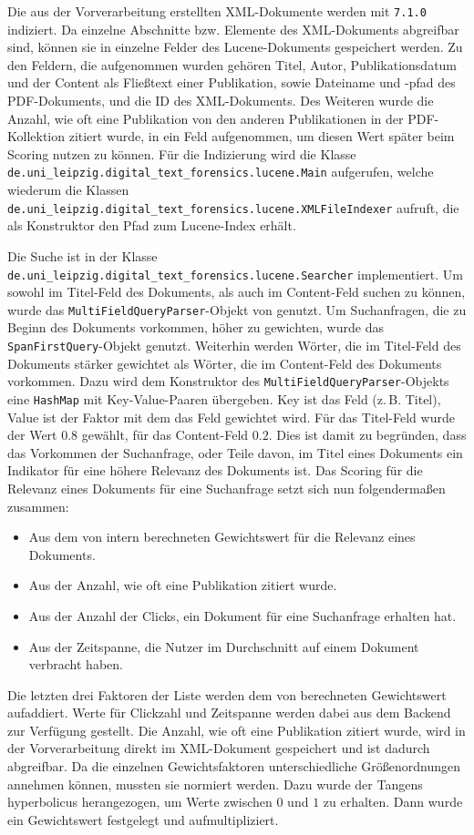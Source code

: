Die aus der Vorverarbeitung erstellten XML-Dokumente werden mit
\lucene \lstinline{7.1.0} indiziert.  Da einzelne Abschnitte
bzw. Elemente des XML-Dokuments abgreifbar sind, können sie in
einzelne Felder des Lucene-Dokuments gespeichert werden.  Zu den
Feldern, die aufgenommen wurden gehören Titel, Autor,
Publikationsdatum und der Content als Fließtext einer Publikation,
sowie Dateiname und -pfad des PDF-Dokuments, und die ID des
XML-Dokuments.  Des Weiteren wurde die Anzahl, wie oft eine
Publikation von den anderen Publikationen in der PDF-Kollektion
zitiert wurde, in ein Feld aufgenommen, um diesen Wert später beim
Scoring nutzen zu können.  Für die Indizierung wird die Klasse
\lstinline{de.uni_leipzig.digital_text_forensics.lucene.Main}
aufgerufen, welche wiederum die Klassen
\lstinline{de.uni_leipzig.digital_text_forensics.lucene.XMLFileIndexer}
aufruft, die als Konstruktor den Pfad zum Lucene-Index erhält.

Die Suche ist in der Klasse \lstinline{de.uni_leipzig.digital_text_forensics.lucene.Searcher} implementiert. 
Um sowohl im Titel-Feld des Dokuments, als auch im Content-Feld suchen zu können, wurde das \lstinline{MultiFieldQueryParser}-Objekt von \lucene genutzt. 
Um Suchanfragen, die zu Beginn des Dokuments vorkommen, höher zu gewichten, wurde das \lstinline{SpanFirstQuery}-Objekt genutzt. 
Weiterhin werden Wörter, die im Titel-Feld des Dokuments stärker gewichtet als Wörter, die im Content-Feld des Dokuments vorkommen. 
Dazu wird dem Konstruktor des \lstinline{MultiFieldQueryParser}-Objekts eine \lstinline{HashMap} mit Key-Value-Paaren übergeben. 
Key ist das Feld (z.\,B. Titel), Value ist der Faktor mit dem das Feld gewichtet wird. 
Für das Titel-Feld wurde der Wert $0.8$ gewählt, für das Content-Feld $0.2$. 
Dies ist damit zu begründen, dass das Vorkommen der Suchanfrage, oder Teile davon, im Titel eines Dokuments ein Indikator für eine höhere Relevanz des Dokuments ist.  
Das Scoring für die Relevanz eines Dokuments für eine Suchanfrage setzt sich nun folgendermaßen zusammen: 
\begin{itemize} 
	\item Aus dem von \lucene intern berechneten Gewichtswert für die Relevanz eines Dokuments. 
	\item Aus der Anzahl, wie oft eine Publikation zitiert wurde. 
	\item Aus der Anzahl der Clicks, ein Dokument für eine Suchanfrage erhalten hat. 
	\item Aus der Zeitspanne, die Nutzer im Durchschnitt auf einem Dokument verbracht haben. 
\end{itemize}
Die letzten drei Faktoren der Liste werden dem von \lucene berechneten Gewichtswert aufaddiert. 
Werte für Clickzahl und Zeitspanne werden dabei aus dem Backend zur Verfügung gestellt. 
Die Anzahl, wie oft eine Publikation zitiert wurde, wird in der Vorverarbeitung direkt im XML-Dokument gespeichert und ist dadurch abgreifbar. 
Da die einzelnen Gewichtsfaktoren unterschiedliche Größenordnungen annehmen können, mussten sie normiert werden. 
Dazu wurde der Tangens hyperbolicus herangezogen, um Werte zwischen $0$ und $1$ zu erhalten. 
Dann wurde ein Gewichtswert festgelegt und aufmultipliziert. 

